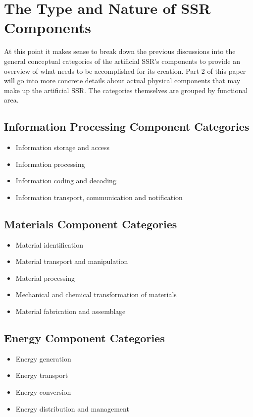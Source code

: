 
\section{The Type and Nature of SSR Components}

At this point it makes sense to break down the previous discussions
into the general conceptual categories of the artificial SSR's components
to provide an overview of what needs to be accomplished for its creation.
Part 2 of this paper will go into more concrete details about actual
physical components that may make up the artificial SSR.  The categories
themselves are grouped by functional area.

\subsection{Information Processing Component Categories}
\begin{itemize}
\item Information storage and access
\item Information processing
\item Information coding and decoding
\item Information transport, communication and notification
\end{itemize}

\subsection{Materials Component Categories}
\begin{itemize}
\item Material identification
\item Material transport and manipulation
\item Material processing
\item Mechanical and chemical transformation of materials
\item Material fabrication and assemblage
\end{itemize}

\subsection{Energy Component Categories}
\begin{itemize}
\item Energy generation
\item Energy transport
\item Energy conversion
\item Energy distribution and management
\end{itemize}

